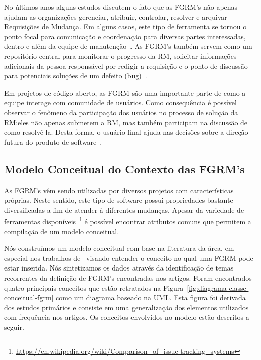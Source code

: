 No últimos anos alguns estudos discutem o fato que as FGRM's não apenas ajudam
as organizações gerenciar, atribuir, controlar, resolver e arquivar Requisições
de Mudança. Em alguns casos, este tipo de ferramenta se tornou o ponto focal
para comunicação e coordenação para diversas partes interessadas, dentro e além
da equipe de manutenção~\cite{Bertram:2010:CCB:1718918.1718972}.  As FGRM's
também servem como um repositório central para monitorar o progresso da RM,
solicitar informações adicionais da pessoa responsável por redigir a requisição
e o ponto de discussão para potenciais soluções de um defeito
(bug)~\cite{zimmermann2009improving}.

Em projetos de código aberto, as FGRM são uma importante parte de como a equipe
interage com comunidade de usuários. Como consequência é possível observar o
fenômeno da participação dos usuários no processo de solução da RM:\@ eles não
apenas submetem a RM, mas também participam na discussão de como resolvê-la.
Desta forma, o usuário final ajuda nas decisões sobre a direção futura do
produto de software~\cite{breu2010information}.

\subsection{Modelo Conceitual do Contexto das FGRM's}
\label{sub:espectro_funcionalidades_fgrm}

As FGRM's vêm sendo utilizadas por diversos projetos com características
próprias. Neste sentido, este tipo de software possui propriedades bastante
diversificadas a fim de atender à diferentes mudanças. Apesar da variedade de
ferramentas
disponíveis~\footnote{\url{https://en.wikipedia.org/wiki/Comparison_of_issue-tracking_systems}}
é possível encontrar atributos comuns que permitem a compilação de um modelo
conceitual.

Nós construímos um modelo conceitual com base na literatura da área, em especial
nos trabalhos de~\cite{cavalcanti2014challenges, singh2011bug,
	kshirsagar2015issue} visando entender o conceito no qual uma FGRM pode estar
inserida. Nós sintetizamos os dados através da identificação de temas
recorrentes da definição de FGRM's encontradas nos artigos. Foram encontrados
quatro principais conceitos que estão retratados na
Figura~\ref{fig:diagrama-classe-conceitual-fgrm} como um diagrama baseado na
UML. Esta figura foi derivada dos estudos primários e consiste em uma
generalização dos elementos utilizados com frequência nos artigos. Os conceitos
envolvidos no modelo estão descritos a seguir.

